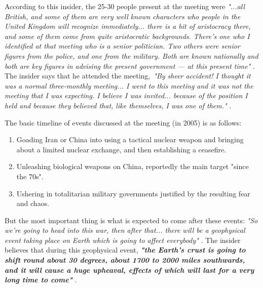 \documentclass[10pt,twocolumn,letterpaper]{article}
\begin{document}
According to this insider, the 25-30 people present at the meeting were \textit{"...all British, and some of them are very well known characters who people in the United Kingdom will recognize immediately... there is a bit of aristocracy there, and some of them come from quite aristocratic backgrounds. There's one who I identified at that meeting who is a senior politician. Two others were senior figures from the police, and one from the military. Both are known nationally and both are key figures in advising the present government — at this present time"} \cite{4}. The insider says that he attended the meeting,\ \textit{"By sheer accident! I thought it was a normal three-monthly meeting... I went to this meeting and it was not the meeting that I was expecting. I believe I was invited... because of the position I held and because they believed that, like themselves, I was one of them."} \cite{4}.

The basic timeline of events discussed at the meeting (in 2005) is as follows:

\begin{flushleft}
\begin{enumerate}
    \item Goading Iran or China into using a tactical nuclear weapon and bringing about a limited nuclear exchange, and then establishing a ceasefire.
    \item Unleashing biological weapons on China, reportedly the main target "since the 70s".
    \item Ushering in totalitarian military governments justified by the resulting fear and chaos.
\end{enumerate}
\end{flushleft}

But the most important thing is what is expected to come after these events: \textit{"So we're going to head into this war, then after that... there will be a geophysical event taking place on Earth which is going to affect everybody"} \cite{4}. The insider believes that during this geophysical event, \textit{\textbf{"the Earth's crust is going to shift round about 30 degrees, about 1700 to 2000 miles southwards, and it will cause a huge upheaval, effects of which will last for a very long time to come"}} \cite{4}.
\end{document}
